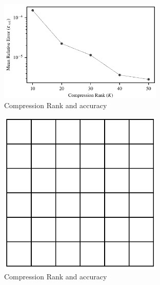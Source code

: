 \documentclass{IEEEcsmag}
\begin{document}
\begin{figure}
\centerline{\includegraphics[width=18.5pc]{figures/compression_accuracy.pdf}}
\caption{Compression Rank and accuracy}
\end{figure}

\begin{figure}
	\centerline{\includegraphics[width=18.5pc]{figures/interaction_lists.pdf}}
	\caption{Compression Rank and accuracy}
\end{figure}
\end{document}

